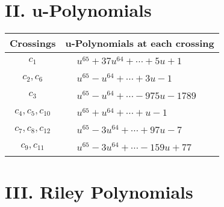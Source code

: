 \documentclass[1p]{elsarticle_modified}
\theoremstyle{definition}
\begin{document}
\newpage\renewcommand{\arraystretch}{1}
\centering \section*{ II. u-Polynomials}
\begin{tabular}{m{50pt}|m{274pt}}
Crossings & \hspace{64pt}u-Polynomials at each crossing \\
\hline $$\begin{aligned}c_{1}\end{aligned}$$&$\begin{aligned}
&u^{65}+37 u^{64}+\cdots+5 u+1
\end{aligned}$\\
\hline $$\begin{aligned}c_{2},c_{6}\end{aligned}$$&$\begin{aligned}
&u^{65}- u^{64}+\cdots+3 u-1
\end{aligned}$\\
\hline $$\begin{aligned}c_{3}\end{aligned}$$&$\begin{aligned}
&u^{65}- u^{64}+\cdots-975 u-1789
\end{aligned}$\\
\hline $$\begin{aligned}c_{4},c_{5},c_{10}\end{aligned}$$&$\begin{aligned}
&u^{65}+u^{64}+\cdots+u-1
\end{aligned}$\\
\hline $$\begin{aligned}c_{7},c_{8},c_{12}\end{aligned}$$&$\begin{aligned}
&u^{65}-3 u^{64}+\cdots+97 u-7
\end{aligned}$\\
\hline $$\begin{aligned}c_{9},c_{11}\end{aligned}$$&$\begin{aligned}
&u^{65}-3 u^{64}+\cdots-159 u+77
\end{aligned}$\\
\hline
\end{tabular}\newpage\renewcommand{\arraystretch}{1}
\centering \section*{ III. Riley Polynomials}
\end{document}

